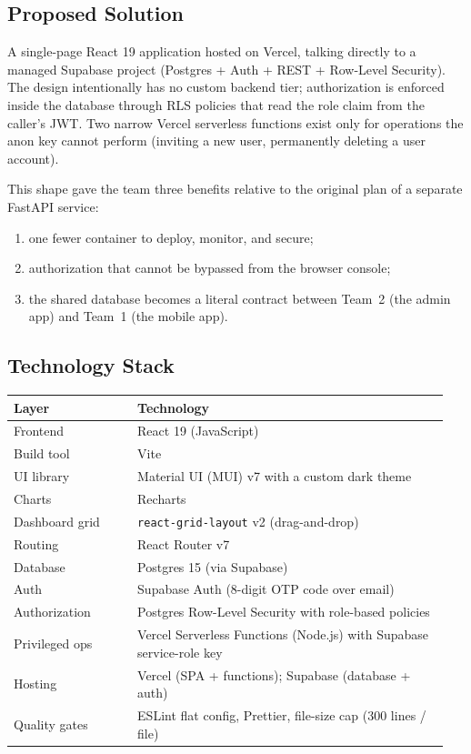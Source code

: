 \documentclass[11pt,letterpaper]{article}
\begin{document}
\subsection{Proposed Solution}

A single-page React 19 application hosted on Vercel, talking directly to
a managed Supabase project (Postgres + Auth + REST + Row-Level Security).
The design intentionally has no custom backend tier; authorization is
enforced inside the database through RLS policies that read the role
claim from the caller's JWT. Two narrow Vercel serverless functions
exist only for operations the anon key cannot perform (inviting a new
user, permanently deleting a user account).

This shape gave the team three benefits relative to the original plan of
a separate FastAPI service:

\begin{enumerate}[noitemsep]
  \item one fewer container to deploy, monitor, and secure;
  \item authorization that cannot be bypassed from the browser console;
  \item the shared database becomes a literal contract between Team~2
        (the admin app) and Team~1 (the mobile app).
\end{enumerate}

\subsection{Technology Stack}

\begin{longtable}{p{0.27\linewidth} p{0.68\linewidth}}
\toprule
\textbf{Layer} & \textbf{Technology} \\
\midrule
Frontend         & React 19 (JavaScript) \\
Build tool       & Vite \\
UI library       & Material UI (MUI) v7 with a custom dark theme \\
Charts           & Recharts \\
Dashboard grid   & \texttt{react-grid-layout} v2 (drag-and-drop) \\
Routing          & React Router v7 \\
Database         & Postgres 15 (via Supabase) \\
Auth             & Supabase Auth (8-digit OTP code over email) \\
Authorization    & Postgres Row-Level Security with role-based policies \\
Privileged ops   & Vercel Serverless Functions (Node.js) with Supabase service-role key \\
Hosting          & Vercel (SPA + functions); Supabase (database + auth) \\
Quality gates    & ESLint flat config, Prettier, file-size cap (300 lines / file) \\
\bottomrule
\end{longtable}
\end{document}
